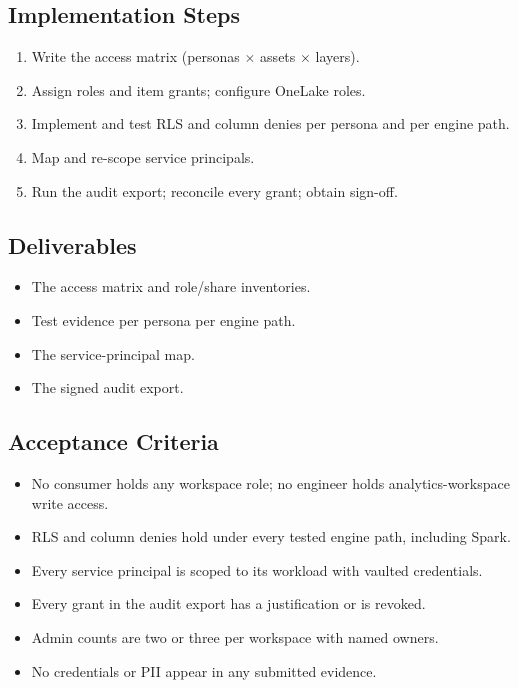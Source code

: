 \subsection*{Implementation Steps}
\begin{enumerate}
    \item Write the access matrix (personas $\times$ assets $\times$ layers).
    \item Assign roles and item grants; configure OneLake roles.
    \item Implement and test RLS and column denies per persona and per engine path.
    \item Map and re-scope service principals.
    \item Run the audit export; reconcile every grant; obtain sign-off.
\end{enumerate}

\subsection*{Deliverables}
\begin{itemize}
    \item The access matrix and role/share inventories.
    \item Test evidence per persona per engine path.
    \item The service-principal map.
    \item The signed audit export.
\end{itemize}

\subsection*{Acceptance Criteria}
\begin{itemize}
    \item[\(\square\)] No consumer holds any workspace role; no engineer holds analytics-workspace write access.
    \item[\(\square\)] RLS and column denies hold under every tested engine path, including Spark.
    \item[\(\square\)] Every service principal is scoped to its workload with vaulted credentials.
    \item[\(\square\)] Every grant in the audit export has a justification or is revoked.
    \item[\(\square\)] Admin counts are two or three per workspace with named owners.
    \item[\(\square\)] No credentials or PII appear in any submitted evidence.
\end{itemize}

